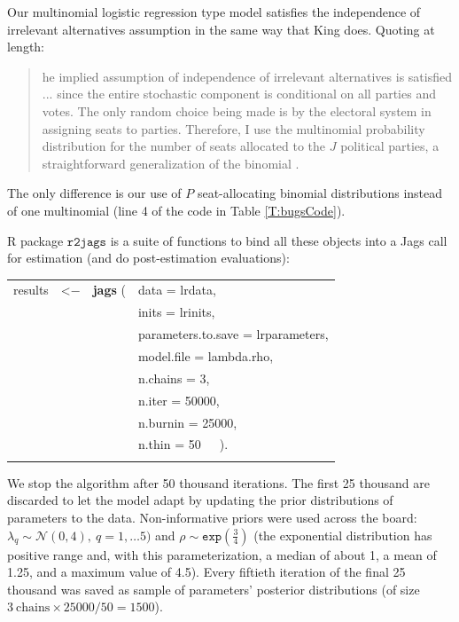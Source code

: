 \documentclass[letter,12pt]{article}
\begin{document}
Our multinomial logistic regression type model satisfies the independence of irrelevant alternatives assumption in the same way that King does. Quoting at length: 
\begin{quotation} 
\singlespacing
\noindent [T]he implied assumption of independence of irrelevant alternatives is satisfied ... since the entire stochastic component is conditional on all parties and votes. The only random choice being made is by the electoral system in assigning seats to parties. Therefore, I use the multinomial probability distribution for the number of seats allocated to the $J$ political parties, a straightforward generalization of the binomial \citep[][:168]{king.1990elRespBiasMultiparty}.
\end{quotation} 
The only difference is our use of $P$ seat-allocating binomial distributions instead of one multinomial (line 4 of the code in Table \ref{T:bugsCode}).

R package $\texttt{r2jags}$ \citep{r.r2jags} is a suite of functions to bind all these objects into a Jags call for estimation (and do post-estimation evaluations):

\begin{center}
\begin{tabular}{ll}
\\
results~~<$-$~~\textbf{jags} ( & data = lrdata, \\ 
                  & inits = lrinits, \\
                  & parameters.to.save = lrparameters, \\
                  & model.file = lambda.rho, \\
                  & n.chains = 3, \\
                  & n.iter = 50000, \\
                  & n.burnin = 25000, \\
                  & n.thin = 50~~~). \\ \\
\end{tabular}
\end{center}

\noindent We stop the algorithm after 50 thousand iterations. The first 25 thousand are discarded to let the model adapt by updating the prior distributions of parameters to the data. Non-informative priors were used across the board: $\lambda_q \sim \mathcal{N}(0, 4),~q=1,\ldots5)$ and $\rho \sim \texttt{exp}(\frac{3}{4})$ (the exponential distribution has positive range and, with this parameterization, a median of about 1, a mean of 1.25, and a maximum value of 4.5). Every fiftieth iteration of the final 25 thousand was saved as sample of parameters' posterior distributions (of size $3~\text{chains} \times 25000/50 = 1500$). 
\end{document}

